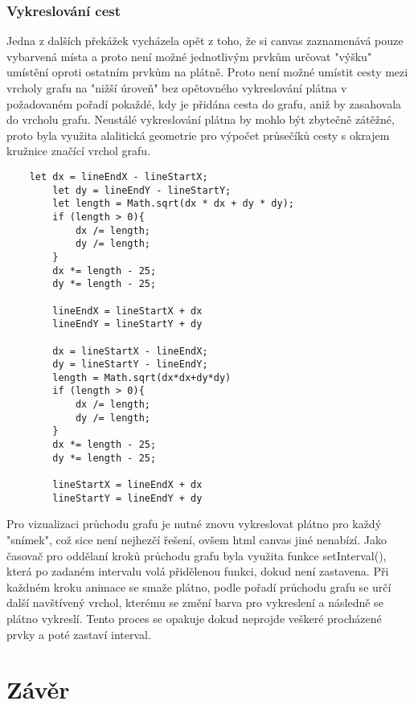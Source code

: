 \documentclass[12pt, titlepage, a4paper]{article}
\begin{document}
\subsubsection{Vykreslování cest}
Jedna z dalších překážek vycházela opět z toho, že si canvas zaznamenává pouze
vybarvená místa a proto není možné jednotlivým prvkům určovat "výšku" \\ umístění
oproti ostatním prvkům na plátně. Proto není možné umístit cesty mezi vrcholy
grafu na "nižší úroveň" bez opětovného vykreslování plátna v požadovaném pořadí
pokaždé, kdy je přidána cesta do grafu, aniž by zasahovala do vrcholu grafu. 
Neustálé vykreslování plátna by mohlo být zbytečně zátěžné, proto byla využita alalitická
geometrie pro výpočet průsečíků cesty s okrajem kružnice
značící vrchol grafu.\par
\begin{lstlisting}
    let dx = lineEndX - lineStartX;
        let dy = lineEndY - lineStartY;
        let length = Math.sqrt(dx * dx + dy * dy);
        if (length > 0){
            dx /= length;
            dy /= length;
        }
        dx *= length - 25;
        dy *= length - 25;

        lineEndX = lineStartX + dx
        lineEndY = lineStartY + dy

        dx = lineStartX - lineEndX;
        dy = lineStartY - lineEndY;
        length = Math.sqrt(dx*dx+dy*dy)
        if (length > 0){
            dx /= length;
            dy /= length;
        }
        dx *= length - 25;
        dy *= length - 25;

        lineStartX = lineEndX + dx
        lineStartY = lineEndY + dy
\end{lstlisting}

Pro vizualizaci průchodu grafu je nutné znovu vykreslovat plátno pro každý 
"snímek", což sice není nejhezčí řešení, ovšem html canvas jiné nenabízí.
Jako časovač pro oddělaní kroků průchodu grafu byla využita funkce setInterval(),
která po zadaném intervalu volá přidělenou funkci, dokud není zastavena. Při každném
kroku animace se smaže plátno, podle pořadí průchodu grafu se určí další navštívený 
vrchol, kterému se změní barva pro vykreslení a následně se plátno vykreslí. Tento
proces se opakuje dokud neprojde veškeré procházené prvky a poté zastaví interval.

\clearpage
\section{Závěr}
\clearpage
\end{document}
